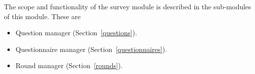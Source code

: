 The scope and functionality of the survey module is described in the sub-modules of this module. These are
\begin{itemize}
 \item Question manager (Section~\ref{questions}).
 \item Questionnaire manager (Section~\ref{questionnaires}).
 \item Round manager (Section~\ref{rounds}).
\end{itemize}

